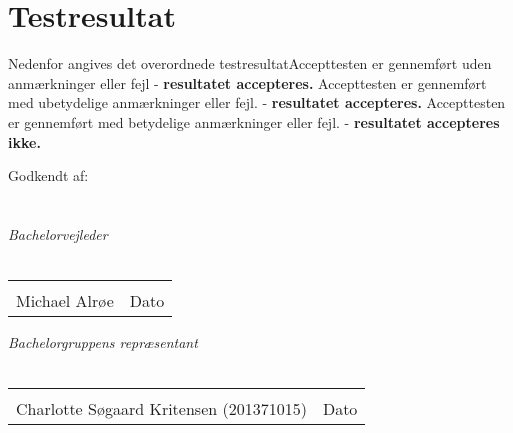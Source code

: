 


\section{Testresultat}

Nedenfor angives det overordnede testresultat\newline
[ ] Accepttesten er gennemført uden anmærkninger eller fejl \newline
- \textbf{resultatet accepteres.} \newline
[ ] Accepttesten er gennemført med ubetydelige anmærkninger eller fejl. \newline
- \textbf{resultatet accepteres.} \newline
[ ] Accepttesten er gennemført med betydelige anmærkninger eller fejl. \newline
- \textbf{resultatet accepteres ikke.} \newline

Godkendt af: \newline
\\
\\
\\
{\large \textit{Bachelorvejleder}}
\\
\\

\noindent \begin{tabular}{ll}
	\makebox[3.0in]{\hrulefill} & \makebox[1.5in]{\hrulefill}\\
	Michael Alrøe & Dato\\[8ex]
\end{tabular}

{\large \textit{Bachelorgruppens repræsentant}}
\\
\\

\noindent \begin{tabular}{ll}
	\makebox[3.0in]{\hrulefill} & \makebox[1.5in]{\hrulefill}\\
	Charlotte Søgaard Kritensen (201371015) & Dato\\[8ex]
\end{tabular}

